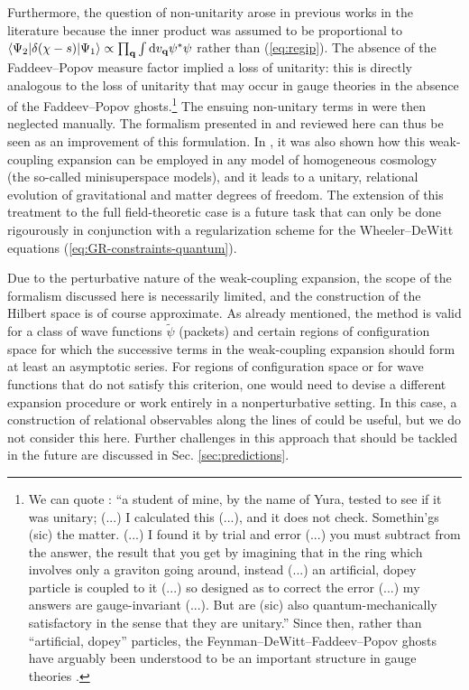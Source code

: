 \documentclass[12pt]{iopart}
\def\eref#1{(\ref{eq:#1})}
\def\D{\mathrm{d}}
\def\q{\mathbf{q}}
\begin{document}
Furthermore, the question of non-unitarity arose in previous works in the literature \citep{kiefer1991quantum,Brizuela:2015tzl,Brizuela:2016gnz,Brizuela:2019jzv} because the inner product was assumed to be proportional to $\braket{\Psi_2|\delta(\chi-s)|\Psi_1} \propto \prod_{\q}\int\D v_{\q}\psi^*\psi$ rather than \eref{regip}. The absence of the Faddeev--Popov measure factor implied a loss of unitarity: this is directly analogous to the loss of unitarity that may occur in gauge theories in the absence of the Faddeev--Popov ghosts.\footnote{We can quote \citet[pp. 848 (704), 849 (705) and 854 (710)]{Feynman:1963}: ``a student of mine, by the name of Yura, tested to see if it was unitary; (...) I calculated this (...), and it does not check. Somethin'gs (sic) the matter. (...) I found it by trial and error (...) you must subtract from the answer, the result that you get by imagining that in the ring which involves only a graviton going around, instead (...) an artificial, dopey particle is coupled to it (...) so designed as to correct the error (...) my answers are gauge-invariant (...). But are (sic) also quantum-mechanically satisfactory in the sense that they are unitary.'' Since then, rather than ``artificial, dopey'' particles, the Feynman--DeWitt--Faddeev--Popov ghosts have arguably been understood to be an important structure in gauge theories \citep{HT:book}.} The ensuing non-unitary terms in \citet{kiefer1991quantum,Brizuela:2015tzl,Brizuela:2016gnz,Brizuela:2019jzv} were then neglected manually. The formalism presented in \citet{Chataignier:2019psm,Chataig:Thesis,Chataignier:2020fap} and reviewed here can thus be seen as an improvement of this formulation. In \citet{Chataignier:2022iwb}, it was also shown how this weak-coupling expansion can be employed in any model of homogeneous cosmology (the so-called minisuperspace models), and it leads to a unitary, relational evolution of gravitational and matter degrees of freedom. The extension of this treatment to the full field-theoretic case is a future task that can only be done rigourously in conjunction with a regularization scheme for the Wheeler--DeWitt equations \eref{GR-constraints-quantum}.

Due to the perturbative nature of the weak-coupling expansion, the scope of the formalism discussed here is necessarily limited, and the construction of the Hilbert space is of course approximate. As already mentioned, the method is valid for a class of wave functions $\tilde{\psi}$ (packets) and certain regions of configuration space for which the successive terms in the weak-coupling expansion should form at least an asymptotic series. For regions of configuration space or for wave functions that do not satisfy this criterion, one would need to devise a different expansion procedure or work entirely in a nonperturbative setting. In this case, a construction of relational observables along the lines of \citet{Chataig:Thesis} could be useful, but we do not consider this here. Further challenges in this approach that should be tackled in the future are discussed in Sec. \ref{sec:predictions}.
\end{document}
